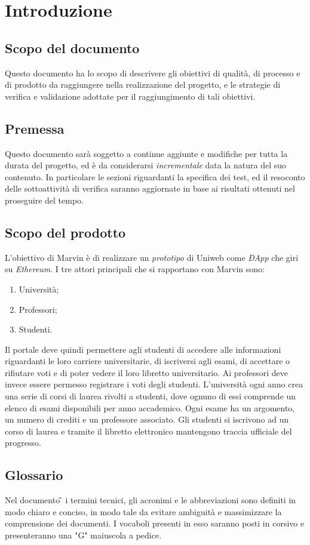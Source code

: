 \section{Introduzione}
\subsection{Scopo del documento}
Questo documento ha lo scopo di descrivere gli obiettivi di qualità, di processo e di prodotto da raggiungere nella realizzazione del progetto, e le strategie di verifica e validazione adottate per il raggiungimento di tali obiettivi.
\subsection{Premessa}
Questo documento sarà soggetto a continue aggiunte e modifiche per tutta la durata del progetto, ed è da considerarsi \textit{incrementale} data la natura del suo contenuto. In particolare le sezioni riguardanti la specifica dei test, ed il resoconto delle sottoattività di verifica saranno aggiornate in base ai risultati ottenuti nel proseguire del tempo.
\subsection{Scopo del prodotto}
L'obiettivo di Marvin è di realizzare un \textit{prototipo} di Uniweb come \textit{ÐApp} che giri su \textit{Ethereum}. I tre attori principali che si rapportano con Marvin sono:
\begin{enumerate}
	\item Università;
	\item Professori;
	\item Studenti.
\end{enumerate}
Il portale deve quindi permettere agli studenti di accedere alle informazioni riguardanti le loro carriere universitarie, di iscriversi agli esami, di accettare o rifiutare voti e di poter vedere il loro libretto universitario.
Ai professori deve invece essere permesso registrare i voti degli studenti.
L'università ogni anno crea una serie di corsi di laurea rivolti a studenti, dove ognuno di essi comprende un elenco di esami disponibili per anno accademico. Ogni esame ha un argomento, un numero di crediti e un professore associato. Gli studenti si iscrivono ad un corso di laurea e tramite il libretto elettronico mantengono traccia ufficiale del progresso.
\subsection{Glossario}
Nel documento \G{} i termini tecnici, gli acronimi e le abbreviazioni sono definiti in modo chiaro e conciso, in modo tale da evitare ambiguità e massimizzare la comprensione dei documenti.
\newline I vocaboli presenti in esso saranno posti in corsivo e presenteranno una "G" maiuscola a pedice.
